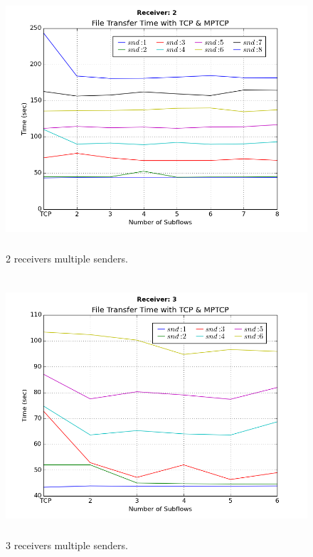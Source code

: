 \documentclass[10pt]{report}
\begin{document}
\begin{appendices}
  \begin{figure}[!b]
    \includegraphics[width=\textwidth,height=3.8in]{images/rcv_2.png}
    \caption{2 receivers multiple senders.}
    \label{fig:rcv2}
  \end{figure}

  \begin{figure}
    \includegraphics[width=\textwidth,height=3.8in]{images/rcv_3.png}
    \caption{3 receivers multiple senders.}
    \label{fig:rcv3}
  \end{figure}


\end{appendices}
\end{document}
